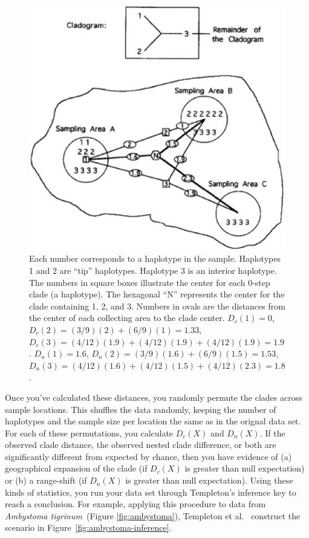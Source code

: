 \documentclass[12pt]{article}
\begin{document}
\begin{figure}
\begin{center}
\includegraphics[scale=0.4]{nca-calculations.eps}
\end{center}
\caption{Each number corresponds to a haplotype in the
  sample. Haplotypes 1 and 2 are ``tip'' haplotypes. Haplotype 3 is an
  interior haplotype. The numbers in square boxes illustrate the
  center for each 0-step clade (a haplotype). The hexagonal ``N''
  represents the center for the clade containing 1, 2, and 3. Numbers
  in ovals are the distances from the center of each collecting area
  to the clade center. $D_c(1)=0$, $D_c(2)=(3/9)(2)+(6/9)(1)=1.33$,
  $D_c(3) = (4/12)(1.9) + (4/12)(1.9) + (4/12)(1.9)=1.9$. $D_n(1) =
  1.6$, $D_n(2)=(3/9)(1.6)+(6/9)(1.5)=1.53$, $D_n(3)=
  (4/12)(1.6)+(4/12)(1.5)+(4/12)(2.3)=1.8$.}\label{fig:nca-calc}
\end{figure}


Once you've calculated these distances, you randomly permute the
clades across sample locations. This shuffles the data randomly,
keeping the number of haplotypes and the sample size per location the
same as in the orignal data set. For each of these permutations, you
calculate $D_c(X)$ and $D_n(X)$. If the observed clade distance, the
observed nested clade difference, or both are significantly different
from expected by chance, then you have evidence of (a) geographical
expansion of the clade (if $D_c(X)$ is greater than null expectation)
or (b) a range-shift (if $D_n(X)$ is greater than null
expectation). Using these kinds of statistics, you run your data set
through Templeton's inference key to reach a conclusion. For example,
applying this procedure to data from {\it Ambystoma tigrinum}~(Figure
\ref{fig:ambystoma}), Templeton et al.~\cite{Templeton-etal-1995}
construct the scenario in Figure~\ref{fig:ambystoma-inference}.
\end{document}
